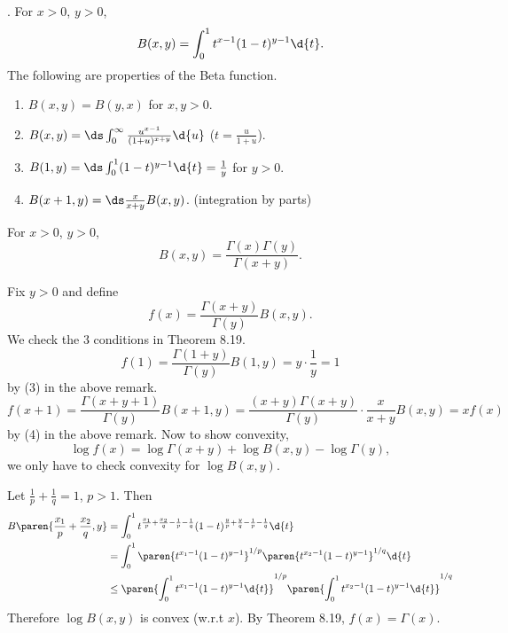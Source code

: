 .  For \(x > 0\), \(y > 0\),
\[
    B(x, y) = \int_0^1 t^{x-1}(1-t)^{y-1} \d{t}.
\]
\rmk The following are properties of the Beta function.
\begin{enumerate}
    \item \(B(x, y) = B(y, x)\) for \(x, y > 0\).
    \item \(B(x, y) = \ds \int_0^\infty \frac{u^{x-1}}{(1+u)^{x+y}} \d{u}\) (\(t = \frac{u}{1+u}\)).
    \item \(B(1, y) = \ds \int_0^1 (1-t)^{y-1} \d{t} = \frac{1}{y}\) for \(y > 0\).
    \item \(B(x + 1, y) = \ds \frac{x}{x+y} B(x, y)\). (integration by parts)
\end{enumerate}

 For \(x > 0\), \(y > 0\),
\[
    B(x, y) = \frac{\Gamma(x) \Gamma(y)}{\Gamma(x+y)}.
\]

\pf Fix \(y > 0\) and define
\[
    f(x) = \frac{\Gamma(x + y)}{\Gamma(y)} B(x, y).
\]
We check the 3 conditions in {\sffamily Theorem 8.19}.
\[
    f(1) = \frac{\Gamma(1+y)}{\Gamma(y)} B(1, y) = y \cdot \frac{1}{y} = 1
\]
by (3) in the above remark.
\[
    f(x + 1) = \frac{\Gamma(x + y + 1)}{\Gamma(y)} B(x + 1, y) = \frac{(x+y)\Gamma(x+y)}{\Gamma(y)} \cdot \frac{x}{x + y} B(x, y) = xf(x)
\]
by (4) in the above remark. Now to show convexity,
\[
    \log f(x) = \log \Gamma(x+y) + \log B(x, y) - \log \Gamma(y),
\]
we only have to check convexity for \(\log B(x, y)\).

Let \(\frac{1}{p} + \frac{1}{q} = 1\), \(p > 1\). Then
\[
    \begin{aligned}
        B\paren{\frac{x_1}{p} + \frac{x_2}{q}, y} & = \int_0^1 t^{\frac{x_1}{p} + \frac{x_2}{q} - \frac{1}{p} - \frac{1}{q}} (1-t)^{\frac{y}{p} + \frac{y}{q} - \frac{1}{p} - \frac{1}{q}} \d{t} \\
                                                  & = \int_0^1 \paren{t^{x_1-1}(1-t)^{y-1}}^{1/p} \paren{t^{x_2-1}(1-t)^{y-1}}^{1/q} \d{t}                                                       \\
                                                  & \leq \paren{\int_0^1 t^{x_1-1}(1-t)^{y-1} \d{t}}^{1/p}\paren{\int_0^1 t^{x_2-1}(1-t)^{y-1} \d{t}}^{1/q}
    \end{aligned}
\]
Therefore \(\log B(x, y)\) is convex (w.r.t \(x\)). By {\sffamily Theorem 8.19}, \(f(x) = \Gamma(x)\).

